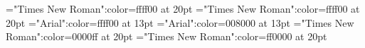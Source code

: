 \documentclass{article}
\begin{document}
 
\thispagestyle{empty} 
\font\tdta="Times New Roman":color=ffff00 at 20pt
\font\tdtbta="Times New Roman":color=ffff00 at 20pt
\font\tdtctbta="Arial":color=ffff00 at 13pt
\font\tctbta="Arial":color=008000 at 13pt
\font\tbta="Times New Roman":color=0000ff at 20pt
\font\ta="Times New Roman":color=ff0000 at 20pt








\end{document}
